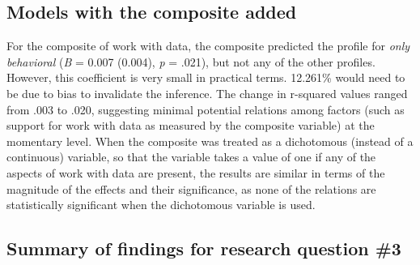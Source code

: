 \documentclass[]{msu-thesis}
\theoremstyle{definition}
\theoremstyle{definition}
\theoremstyle{definition}
\theoremstyle{remark}
\begin{document}
\subsection{Models with the composite
added}\label{models-with-the-composite-added}

For the composite of work with data, the composite predicted the profile
for \emph{only behavioral} (\emph{B} = 0.007 (0.004), \emph{p} = .021),
but not any of the other profiles. However, this coefficient is very
small in practical terms. 12.261\% would need to be due to bias to
invalidate the inference. The change in r-squared values ranged from
.003 to .020, suggesting minimal potential relations among factors (such
as support for work with data as measured by the composite variable) at
the momentary level. When the composite was treated as a dichotomous
(instead of a continuous) variable, so that the variable takes a value
of one if any of the aspects of work with data are present, the results
are similar in terms of the magnitude of the effects and their
significance, as none of the relations are statistically significant
when the dichotomous variable is used.

\begin{table}

\caption{\label{tab:unnamed-chunk-12}Results of mixed effects models for the composite}
\centering
{}
\end{table}

\subsection{Summary of findings for research question
\#3}\label{summary-of-findings-for-research-question-3}
\end{document}
